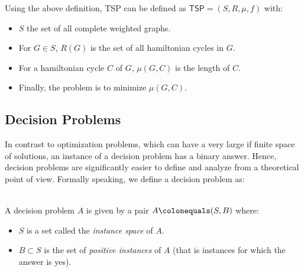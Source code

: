         Using the above definition, \textsf{TSP} can be defined as \(\textsf{TSP} = (S, R, \mu, f)\) with:
        \begin{itemize}
            \item \(S\) the set of all complete weighted graphs.
            \item For \(G\in S\), \(R(G)\) is the set of all hamiltonian cycles in \(G\).
            \item For a hamiltonian cycle \(C\) of \(G\), \(\mu(G, C)\) is the length of \(C\).
            \item Finally, the problem is to minimize \(\mu(G, C)\).
        \end{itemize}


    \subsection{Decision Problems}

        In contrast to optimization problems, which can have a very large if finite space of solutions, an instance of a decision problem has a binary answer. Hence, decision problems are significantly easier to define and analyze from a theoretical point of view. Formally speaking, we define a decision problem as:

        \begin{definition}\ \\
            A decision problem \(A\) is given by a pair \(A \colonequals (S, B)\) where:
            \begin{itemize}
                \item \(S\) is a set called the \emph{instance space} of \(A\).
                \item \(B \subset S\) is the set of \emph{positive instances} of \(A\) (that is instances for which the answer is yes).
            \end{itemize}
        \end{definition}